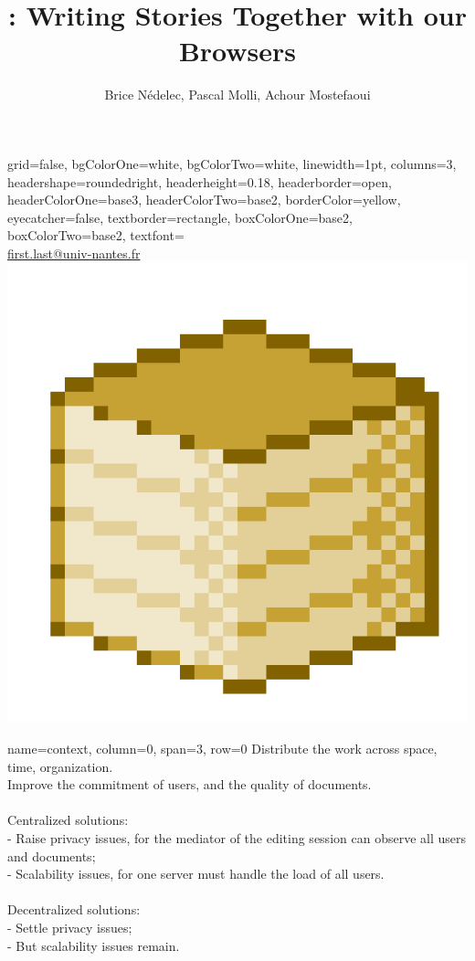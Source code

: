 \documentclass[a1paper, portrait]{baposter}
\title{\CRATE: Writing Stories Together with our Browsers}
\author{Brice Nédelec, Pascal Molli, Achour Mostefaoui}
\begin{document}
\begin{poster}{
    grid=false,
    bgColorOne=white,
    bgColorTwo=white,
    linewidth=1pt,
    columns=3,
    headershape=roundedright, 
    headerheight=0.18\textheight,
    headerborder=open,
    headerColorOne=base3,
    headerColorTwo=base2,
    borderColor=yellow,
    eyecatcher=false,
    textborder=rectangle,
    boxColorOne=base2,
    boxColorTwo=base2,
    textfont=\sffamily
  }
  {}
  {\huge\textsc{\thetitle}\vspace{0.4em}}
  {\theauthor \\ \url{first.last@univ-nantes.fr}}
  {\includegraphics[height=0.16\textheight, interpolate=false]{logos/crateicon.png}}

  {name=context, column=0, span=3, row=0} {
    Distribute the work across space, time, organization.\\
    Improve the commitment of users, and the quality of documents.\\
    \\
    Centralized solutions: \\
    - Raise privacy issues, for the mediator of the editing session can
      observe all users and documents; \\
    - Scalability issues, for one server must handle the load of all users. \\
    \\
    Decentralized solutions: \\
    - Settle privacy issues; \\
    - But scalability issues remain.
  }


\end{poster}
\end{document}
